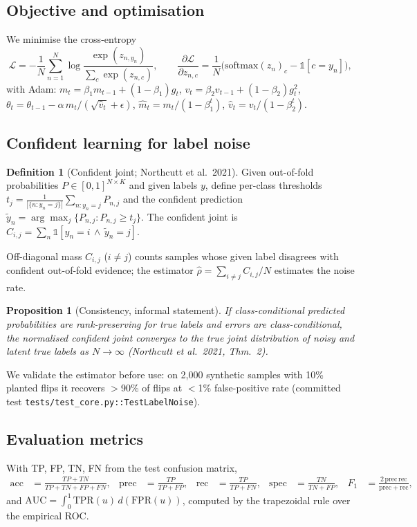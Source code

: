 \documentclass[11pt]{article}
\newtheorem{proposition}{Proposition}
\theoremstyle{definition}
\newtheorem{definition}{Definition}
\begin{document}
\subsection{Objective and optimisation}
We minimise the cross-entropy
\begin{equation}
\mathcal L = -\frac{1}{N}\sum_{n=1}^N \log \frac{\exp(z_{n,y_n})}{\sum_{c}\exp(z_{n,c})},
\qquad
\frac{\partial \mathcal L}{\partial z_{n,c}} = \frac{1}{N}\big(\mathrm{softmax}(z_n)_c - \mathbb 1[c = y_n]\big),
\label{eq:xent}
\end{equation}
with Adam: $m_t = \beta_1 m_{t-1} + (1-\beta_1) g_t$,
$v_t = \beta_2 v_{t-1} + (1-\beta_2) g_t^2$,
$\theta_t = \theta_{t-1} - \alpha\, \hat m_t/(\sqrt{\hat v_t}+\epsilon)$,
$\hat m_t = m_t/(1-\beta_1^t)$, $\hat v_t = v_t/(1-\beta_2^t)$.

\subsection{Confident learning for label noise}
\begin{definition}[Confident joint; Northcutt et al.\ 2021]
Given out-of-fold probabilities $P \in [0,1]^{N \times K}$ and given labels
$y$, define per-class thresholds $t_j = \frac{1}{|\{n: y_n=j\}|}\sum_{n: y_n=j} P_{n,j}$
and the confident prediction $\tilde y_n = \arg\max_j \{P_{n,j} : P_{n,j} \ge t_j\}$.
The confident joint is $C_{i,j} = \sum_n \mathbb 1[y_n = i \,\wedge\, \tilde y_n = j]$.
\end{definition}
Off-diagonal mass $C_{i,j}$ ($i\neq j$) counts samples whose given label
disagrees with confident out-of-fold evidence; the estimator
$\hat\rho = \sum_{i\neq j} C_{i,j} / N$ estimates the noise rate.
\begin{proposition}[Consistency, informal statement]
If class-conditional predicted probabilities are rank-preserving for true
labels and errors are class-conditional, the normalised confident joint
converges to the true joint distribution of noisy and latent true labels as
$N \to \infty$ (Northcutt et al.\ 2021, Thm.\ 2).
\end{proposition}
We validate the estimator before use: on 2{,}000 synthetic samples with 10\%
planted flips it recovers $>$90\% of flips at $<$1\% false-positive rate
(committed test \texttt{tests/test\_core.py::TestLabelNoise}).

\subsection{Evaluation metrics}
With TP, FP, TN, FN from the test confusion matrix,
\begin{align}
\mathrm{acc} &= \tfrac{TP+TN}{TP+TN+FP+FN}, &
\mathrm{prec} &= \tfrac{TP}{TP+FP}, &
\mathrm{rec} &= \tfrac{TP}{TP+FN}, &
\mathrm{spec} &= \tfrac{TN}{TN+FP}, &
F_1 &= \tfrac{2\,\mathrm{prec}\,\mathrm{rec}}{\mathrm{prec}+\mathrm{rec}},
\end{align}
and $\mathrm{AUC} = \int_0^1 \mathrm{TPR}(u)\, d(\mathrm{FPR}(u))$, computed
by the trapezoidal rule over the empirical ROC.
\end{document}
